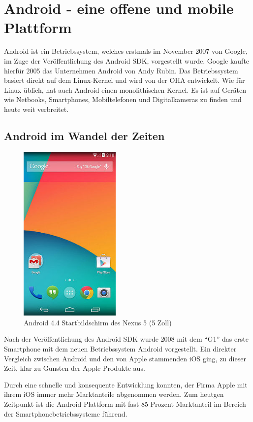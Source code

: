 \section{Android - eine offene und mobile Plattform}
Android ist ein Betriebssystem, welches erstmals im November 2007 von Google, im Zuge der Ver\"offentlichung des Android \ac{SDK}, vorgestellt wurde. Google kaufte hierf\"ur 2005 das Unternehmen Android von Andy Rubin. Das Betriebssystem basiert direkt auf dem Linux-Kernel und wird von der \ac{OHA} entwickelt. Wie f\"ur Linux \"ublich, hat auch Android einen monolithischen Kernel. Es ist auf Ger\"aten wie Netbooks, Smartphones, Mobiltelefonen und Digitalkameras zu finden und heute weit verbreitet. \cite{Kuehn12}

\subsection{Android im Wandel der Zeiten}
\begin{figure}
\vspace{-13pt}
\includegraphics[width=4.95cm]{Bilder/Android4.jpg}
\caption{Android 4.4 Startbildschirm des Nexus 5 (5 Zoll) \cite{WikiAndroid}}
\label{Startbildschirm des Nexus 5}
\vspace{-20pt}
\end{figure}
Nach der Ver\"offentlichung des Android \ac{SDK} wurde 2008 mit dem "`G1"' das erste Smartphone mit dem neuen Betriebssystem Android vorgestellt. Ein direkter Vergleich zwischen Android und den von Apple stammenden iOS ging, zu dieser Zeit, klar zu Gunsten der Apple-Produkte aus.
 
Durch eine schnelle und konsequente Entwicklung konnten, der Firma Apple mit ihrem iOS immer mehr Marktanteile abgenommen werden. Zum heutgen Zeitpunkt ist die Android-Plattform mit fast 85 Prozent Marktanteil im Bereich der Smartphonebetriebssysteme f\"uhrend. \cite{GolemMobileBetriebssystem}

